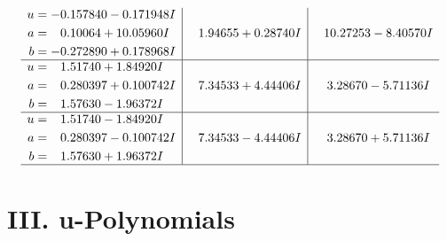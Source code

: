 \documentclass[1p]{elsarticle_modified}
\theoremstyle{definition}
\begin{document}
$$\begin{array}{c|c|c}
\begin{aligned}
u &= -0.157840 - 0.171948 I \\
a &= \phantom{-}0.10064 + 10.05960 I \\
b &= -0.272890 + 0.178968 I\end{aligned}
 & \phantom{-}1.94655 + 0.28740 I & \phantom{-}10.27253 - 8.40570 I \\ \hline\begin{aligned}
u &= \phantom{-}1.51740 + 1.84920 I \\
a &= \phantom{-}0.280397 + 0.100742 I \\
b &= \phantom{-}1.57630 - 1.96372 I\end{aligned}
 & \phantom{-}7.34533 + 4.44406 I & \phantom{-}3.28670 - 5.71136 I \\ \hline\begin{aligned}
u &= \phantom{-}1.51740 - 1.84920 I \\
a &= \phantom{-}0.280397 - 0.100742 I \\
b &= \phantom{-}1.57630 + 1.96372 I\end{aligned}
 & \phantom{-}7.34533 - 4.44406 I & \phantom{-}3.28670 + 5.71136 I\\
 \hline 
 \end{array}$$\newpage
\newpage\renewcommand{\arraystretch}{1}
\centering \section*{ III. u-Polynomials}
\end{document}
